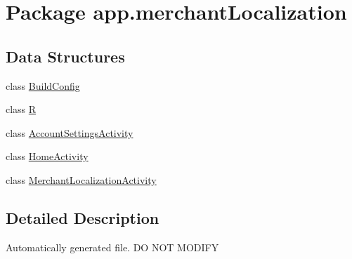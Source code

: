 \hypertarget{namespaceapp_1_1merchant_localization}{\section{Package app.\-merchant\-Localization}
\label{namespaceapp_1_1merchant_localization}
}
\subsection*{Data Structures}
\begin{DoxyCompactItemize}
\item 
class \hyperlink{classapp_1_1merchant_localization_1_1_build_config}{Build\-Config}
\item 
class \hyperlink{classapp_1_1merchant_localization_1_1_r}{R}
\item 
class \hyperlink{classapp_1_1merchant_localization_1_1_account_settings_activity}{Account\-Settings\-Activity}
\item 
class \hyperlink{classapp_1_1merchant_localization_1_1_home_activity}{Home\-Activity}
\item 
class \hyperlink{classapp_1_1merchant_localization_1_1_merchant_localization_activity}{Merchant\-Localization\-Activity}
\end{DoxyCompactItemize}


\subsection{Detailed Description}
Automatically generated file. D\-O N\-O\-T M\-O\-D\-I\-F\-Y 